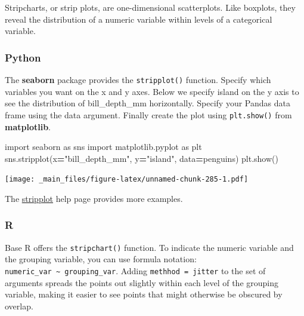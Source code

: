 \documentclass[
]{book}
\newenvironment{Shaded}{\begin{snugshade}}{\end{snugshade}}
\newcommand{\ImportTok}[1]{#1}
\newcommand{\NormalTok}[1]{#1}
\newcommand{\OperatorTok}[1]{\textcolor[rgb]{0.81,0.36,0.00}{\textbf{#1}}}
\newcommand{\StringTok}[1]{\textcolor[rgb]{0.31,0.60,0.02}{#1}}
\begin{document}
Stripcharts, or strip plots, are one-dimensional scatterplots. Like boxplots, they reveal the distribution of a numeric variable within levels of a categorical variable.

\hypertarget{python-44}{%
\subsubsection*{Python}\label{python-44}}

The \textbf{seaborn} package provides the \texttt{stripplot()} function. Specify which variables you want on the x and y axes. Below we specify island on the y axis to see the distribution of bill\_depth\_mm horizontally. Specify your Pandas data frame using the data argument. Finally create the plot using \texttt{plt.show()} from \textbf{matplotlib}.

\begin{Shaded}
\begin{Highlighting}[]
\ImportTok{import}\NormalTok{ seaborn }\ImportTok{as}\NormalTok{ sns}
\ImportTok{import}\NormalTok{ matplotlib.pyplot }\ImportTok{as}\NormalTok{ plt}
\NormalTok{sns.stripplot(x}\OperatorTok{=}\StringTok{"bill\_depth\_mm"}\NormalTok{, y}\OperatorTok{=}\StringTok{"island"}\NormalTok{, data}\OperatorTok{=}\NormalTok{penguins)}
\NormalTok{plt.show()}
\end{Highlighting}
\end{Shaded}

\texttt{[image: \_main\_files/figure-latex/unnamed-chunk-285-1.pdf]}

The \href{https://seaborn.pydata.org/generated/seaborn.stripplot.html}{stripplot} help page provides more examples.

\hypertarget{r-44}{%
\subsubsection*{R}\label{r-44}}

Base R offers the \texttt{stripchart()} function. To indicate the numeric variable and the grouping variable, you can use formula notation: \texttt{numeric\_var\ \textasciitilde{}\ grouping\_var}. Adding \texttt{methhod\ =\ \textquotesingle{}jitter\textquotesingle{}} to the set of arguments spreads the points out slightly within each level of the grouping variable, making it easier to see points that might otherwise be obscured by overlap.
\end{document}
